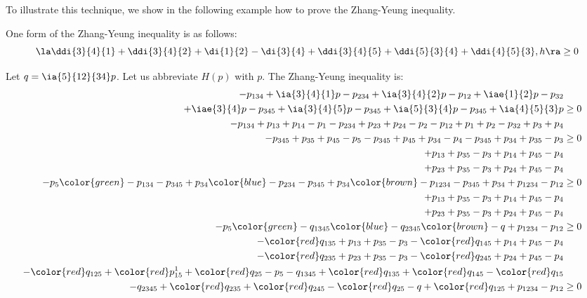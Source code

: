 \documentclass[11pt,twoside,a4paper,openright]{uclouvain-thesis}
\begin{document}
To illustrate this technique, we show in the following example how to prove the Zhang-Yeung inequality.

\begin{myexem}


One form of the Zhang-Yeung inequality is as follows:
\[ \la \ddi{3}{4}{1} + \ddi{3}{4}{2} + \di{1}{2} - \di{3}{4} + \ddi{3}{4}{5} + \ddi{5}{3}{4} + \ddi{4}{5}{3}, h \ra \geq 0 \]

Let $q = \ia{5}{12}{34} p$.
Let us abbreviate $H(p)$ with $p$.
The Zhang-Yeung inequality is:
\begin{align}
  \notag
  -p_{134} + \ia{3}{4}{1}p - p_{234} + \ia{3}{4}{2}p - p_{12} + \iae{1}{2}p - p_{32}\\
  \notag
  + \iae{3}{4}p - p_{345} + \ia{3}{4}{5}p - p_{345} + \ia{5}{3}{4}p - p_{345} + \ia{4}{5}{3}p & \geq 0\\
  \notag
  -p_{134} + p_{13} + p_{14} - p_1 - p_{234} + p_{23} + p_{24} - p_2 - p_{12} + p_1 + p_2 - p_{32} + p_3 + p_4\\
  \notag
  -p_{345} + p_{35} + p_{45} - p_5 - p_{345} + p_{45} + p_{34} - p_4 - p_{345} + p_{34} + p_{35} - p_3 & \geq 0\\
  \notag
  + p_{13} + p_{35} - p_3 + p_{14} + p_{45} - p_4\\
  \notag
  + p_{23} + p_{35} - p_3 + p_{24} + p_{45} - p_4\\
  \notag
  - p_5 {\color{green}- p_{134} - p_{345} + p_{34}} {\color{blue}- p_{234} - p_{345} + p_{34}} {\color{brown}- p_{1234} - p_{345} + p_{34}} + p_{1234} - p_{12} & \geq 0\\
  \notag
  + p_{13} + p_{35} - p_3 + p_{14} + p_{45} - p_4\\
  \notag
  + p_{23} + p_{35} - p_3 + p_{24} + p_{45} - p_4\\
  \notag
  - p_5 {\color{green}- q_{1345}} {\color{blue}- q_{2345}} {\color{brown}- q} + p_{1234} - p_{12} & \geq 0\\
  \notag
  - {\color{red}q_{135}} + p_{13} + p_{35} - p_3 - {\color{red}q_{145}} + p_{14} + p_{45} - p_4\\
  \notag
  - {\color{red}q_{235}} + p_{23} + p_{35} - p_3 - {\color{red}q_{245}} + p_{24} + p_{45} - p_4\\
  \notag
  - {\color{red}q_{125}} + {\color{red}p_{15}^1} + {\color{red}q_{25}} - p_5 - q_{1345} + {\color{red}q_{135}} + {\color{red}q_{145}} - {\color{red}q_{15}}\\
  \notag
  - q_{2345} + {\color{red}q_{235}} + {\color{red}q_{245}} - {\color{red}q_{25}} - q + {\color{red}q_{125}} + p_{1234} - p_{12} & \geq 0\\

\end{align}
\end{myexem}
\end{document}
